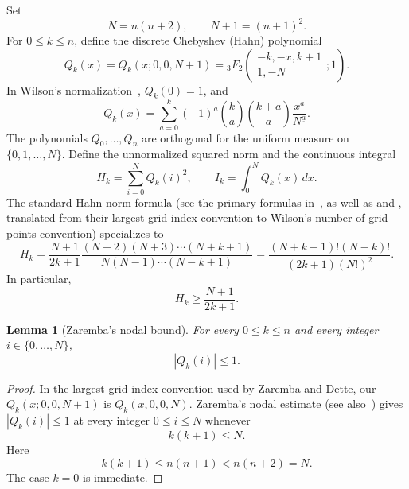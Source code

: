 \documentclass[11pt]{article}
\newtheorem{lemma}[theorem]{Lemma}
\theoremstyle{definition}
\theoremstyle{remark}
\newcommand{\fall}[2]{#1^{\underline{#2}}}
\begin{document}
Set
\begin{equation}\label{eq:N-choice}
  N=n(n+2),
  \qquad N+1=(n+1)^2.
\end{equation}
For \(0\leq k\leq n\), define the discrete Chebyshev (Hahn) polynomial
\begin{equation}\label{eq:Q-hypergeom}
  Q_k(x)=Q_k(x;0,0,N+1)
  ={}_3F_2\!\left(\begin{matrix}-k,-x,k+1\\1,-N\end{matrix};1\right).
\end{equation}
In Wilson's normalization~\cite{wilson-hahn}, \(Q_k(0)=1\), and
\begin{equation}\label{eq:Q-expansion}
  Q_k(x)=\sum_{a=0}^k(-1)^a
  \binom ka\binom{k+a}{a}
  \frac{\fall{x}{a}}{\fall{N}{a}}.
\end{equation}
The polynomials \(Q_0,\ldots,Q_n\) are orthogonal for the uniform measure on
\(\{0,1,\ldots,N\}\).  Define the unnormalized squared norm and the continuous
integral
\[
  H_k=\sum_{i=0}^NQ_k(i)^2,
  \qquad
  I_k=\int_0^NQ_k(x)\,dx.
\]
The standard Hahn norm formula
(see the primary formulas in~\cite{karlin-mcgregor1961,dette1995}, as well as
\cite[Sec.~9.5, Eq.~(9.5.2)]{koekoek2010} and
\cite[Table~18.19.1]{dlmf}, translated from their largest-grid-index
convention to Wilson's number-of-grid-points convention) specializes to
\begin{equation}\label{eq:H-norm}
  H_k
  =\frac{N+1}{2k+1}
   \frac{(N+2)(N+3)\cdots(N+k+1)}{N(N-1)\cdots(N-k+1)}
  =\frac{(N+k+1)!(N-k)!}{(2k+1)(N!)^2}.
\end{equation}
In particular,
\begin{equation}\label{eq:H-lower}
  H_k\geq\frac{N+1}{2k+1}.
\end{equation}

\begin{lemma}[Zaremba's nodal bound]\label{lem:Q-supnorm}
For every \(0\leq k\leq n\) and every integer \(i\in\{0,\ldots,N\}\),
\begin{equation}\label{eq:Q-supnorm}
  |Q_k(i)|\leq1.
\end{equation}
\end{lemma}

\begin{proof}
In the largest-grid-index convention used by Zaremba and Dette, our
\(Q_k(x;0,0,N+1)\) is \(Q_k(x,0,0,N)\).  Zaremba's nodal estimate
\cite{zaremba1975} (see also~\cite[Remark~3.3]{dette1995}) gives
\(|Q_k(i)|\leq1\) at every integer \(0\leq i\leq N\) whenever
\[
  k(k+1)\leq N.
\]
Here
\[
  k(k+1)\leq n(n+1)<n(n+2)=N.
\]
The case \(k=0\) is immediate.
\end{proof}
\end{document}
